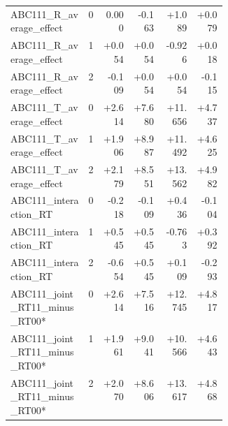 \begin{longtable}{@{}p{0.36\linewidth}rrrrr@{}}
ABC111\_\allowbreak{}R\_\allowbreak{}average\_\allowbreak{}effect & 0 & 0.000 & -0.163 & +1.089 & +0.079 \\
ABC111\_\allowbreak{}R\_\allowbreak{}average\_\allowbreak{}effect & 1 & +0.054 & +0.054 & -0.926 & +0.018 \\
ABC111\_\allowbreak{}R\_\allowbreak{}average\_\allowbreak{}effect & 2 & -0.109 & +0.054 & +0.054 & -0.115 \\
ABC111\_\allowbreak{}T\_\allowbreak{}average\_\allowbreak{}effect & 0 & +2.614 & +7.680 & +11.656 & +4.737 \\
ABC111\_\allowbreak{}T\_\allowbreak{}average\_\allowbreak{}effect & 1 & +1.906 & +8.987 & +11.492 & +4.625 \\
ABC111\_\allowbreak{}T\_\allowbreak{}average\_\allowbreak{}effect & 2 & +2.179 & +8.551 & +13.562 & +4.982 \\
ABC111\_\allowbreak{}interaction\_\allowbreak{}RT & 0 & -0.218 & -0.109 & +0.436 & -0.104 \\
ABC111\_\allowbreak{}interaction\_\allowbreak{}RT & 1 & +0.545 & +0.545 & -0.763 & +0.392 \\
ABC111\_\allowbreak{}interaction\_\allowbreak{}RT & 2 & -0.654 & +0.545 & +0.109 & -0.293 \\
ABC111\_\allowbreak{}joint\_\allowbreak{}RT11\_\allowbreak{}minus\_\allowbreak{}RT00* & 0 & +2.614 & +7.516 & +12.745 & +4.817 \\
ABC111\_\allowbreak{}joint\_\allowbreak{}RT11\_\allowbreak{}minus\_\allowbreak{}RT00* & 1 & +1.961 & +9.041 & +10.566 & +4.643 \\
ABC111\_\allowbreak{}joint\_\allowbreak{}RT11\_\allowbreak{}minus\_\allowbreak{}RT00* & 2 & +2.070 & +8.606 & +13.617 & +4.868 \\
\end{longtable}
\endgroup
